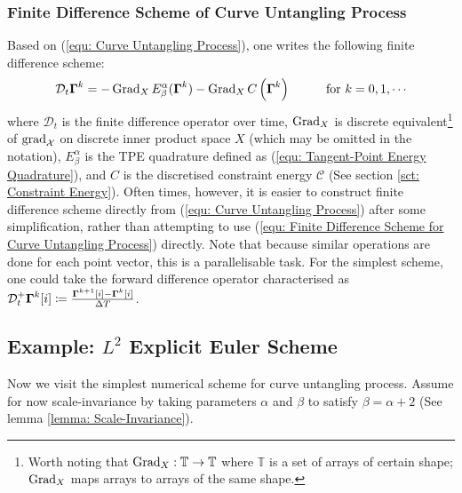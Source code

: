 \documentclass[../dissertation.tex]{subfiles}
\begin{document}
\subsubsection{Finite Difference Scheme of Curve Untangling Process}
Based on (\ref{equ: Curve Untangling Process}), one writes the following finite difference scheme:
\begin{equation}
    \mathcal{D}_{t} \Gammabf^{k} = -\Grad_{X} E_{\beta}^{\alpha} (\Gammabf^k) - \Grad_{X} C \left( \Gammabf^k \right) \hspace{1cm} \text{for } k=0,1,\cdots
    \label{equ: Finite Difference Scheme for Curve Untangling Process}
\end{equation}
where $\mathcal{D}_t$ is the finite difference operator over time,
$\operatorname{Grad}_{X}$ is discrete equivalent\footnote{Worth noting that $\operatorname{Grad}_X:\mathbb{T} \rightarrow \mathbb{T}$ where $\mathbb{T}$ is a set of arrays of certain shape; $\operatorname{Grad}_X$ maps arrays to arrays of the same shape.}  of $\operatorname{grad}_{\mathcal{X}}$ on discrete inner product space $X$ (which may be omitted in the notation),
$E_{\beta}^{\alpha}$ is the TPE quadrature defined as (\ref{equ: Tangent-Point Energy Quadrature}),
and $C$ is the discretised constraint energy $\mathcal{C}$ (See section \ref{sct: Constraint Energy}).
Often times, however, it is easier to construct finite difference scheme directly from (\ref{equ: Curve Untangling Process}) after some simplification,
rather than attempting to use (\ref{equ: Finite Difference Scheme for Curve Untangling Process}) directly.
Note that because similar operations are done for each point vector, this is a parallelisable task.
For the simplest scheme, one could take the forward difference operator characterised as $\mathcal{D}_t^+ \boldsymbol{\Gamma}^k[i] \coloneqq \frac{\boldsymbol{\Gamma}^{k+1}[i] - \boldsymbol{\Gamma}^{k}[i]}{\Delta T}$.

\subsection{Example: $L^2$ Explicit Euler Scheme}
Now we visit the simplest numerical scheme for curve untangling process.
Assume for now scale-invariance by taking parameters $\alpha$ and $\beta$ to satisfy $\beta = \alpha+2$ (See lemma \ref{lemma: Scale-Invariance}).
\end{document}
